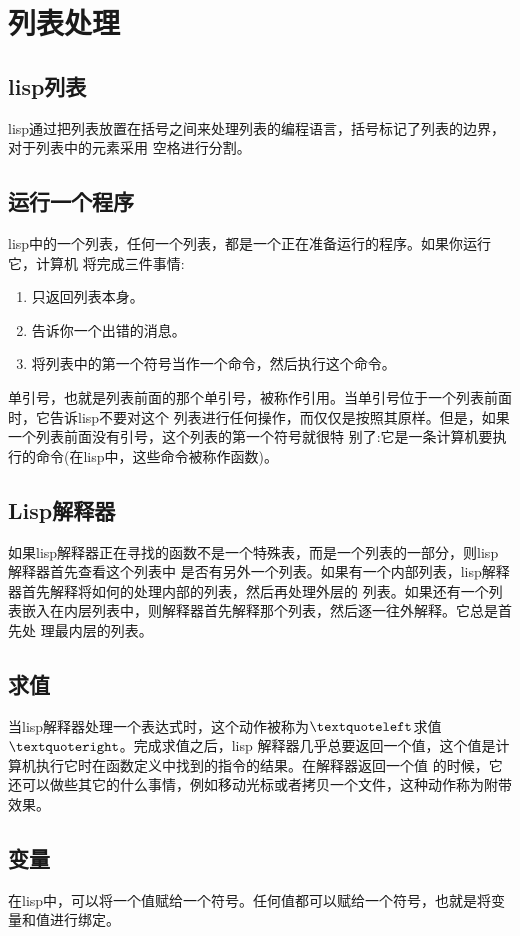\chapter{列表处理}
\section{lisp列表}
lisp通过把列表放置在括号之间来处理列表的编程语言，括号标记了列表的边界，对于列表中的元素采用
空格进行分割。

\section{运行一个程序}
lisp中的一个列表，任何一个列表，都是一个正在准备运行的程序。如果你运行它，计算机
将完成三件事情:
\begin{enumerate}
\item 只返回列表本身。
\item 告诉你一个出错的消息。
\item 将列表中的第一个符号当作一个命令，然后执行这个命令。
\end{enumerate}
单引号，也就是列表前面的那个单引号，被称作引用。当单引号位于一个列表前面时，它告诉lisp不要对这个
列表进行任何操作，而仅仅是按照其原样。但是，如果一个列表前面没有引号，这个列表的第一个符号就很特
别了:它是一条计算机要执行的命令(在lisp中，这些命令被称作函数)。

\section{Lisp解释器}
如果lisp解释器正在寻找的函数不是一个特殊表，而是一个列表的一部分，则lisp解释器首先查看这个列表中
是否有另外一个列表。如果有一个内部列表，lisp解释器首先解释将如何的处理内部的列表，然后再处理外层的
列表。如果还有一个列表嵌入在内层列表中，则解释器首先解释那个列表，然后逐一往外解释。它总是首先处
理最内层的列表。

\section{求值}
当lisp解释器处理一个表达式时，这个动作被称为$\textquoteleft$求值$\textquoteright$。完成求值之后，lisp
解释器几乎总要返回一个值，这个值是计算机执行它时在函数定义中找到的指令的结果。在解释器返回一个值
的时候，它还可以做些其它的什么事情，例如移动光标或者拷贝一个文件，这种动作称为附带效果。

\section{变量}
在lisp中，可以将一个值赋给一个符号。任何值都可以赋给一个符号，也就是将变量和值进行绑定。

